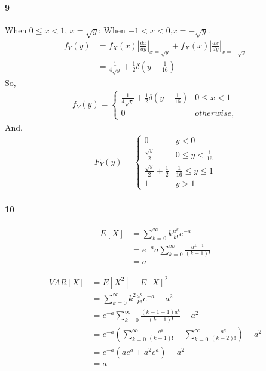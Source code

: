 \documentclass[22pt]{article}
\begin{document}
	\paragraph{9} When $0\leq x <1$, $x = \sqrt{y}$; When $-1<x<0$,$x = -\sqrt{y}$.
	\begin{align}
	f_Y(y) & = f_X(x)|\frac{dx}{dy}|_{x = \sqrt{y}} + f_X(x)|\frac{dx}{dy}|_{x = -\sqrt{y}}\\
	& = \frac{1}{4\sqrt{y}} + \frac{1}{2}\delta(y-\frac{1}{16})
	\end{align} 
	So,\begin{align}
	f_Y(y) = 
				\begin{cases}
				 \frac{1}{4\sqrt{y}} + \frac{1}{2}\delta(y-\frac{1}{16}) & 0\leq x <1\\
				 0 & otherwise,
				\end{cases}
	\end{align}
	And,\begin{align}
	F_Y(y) = 
				\begin{cases}
				 0 & y <0\\
				\frac{\sqrt{y}}{2} & 0\leq y<\frac{1}{16}\\
				\frac{\sqrt{y}}{2} + \frac{1}{2} & \frac{1}{16} \leq y \leq 1\\
				 1 & y>1
				\end{cases}
	\end{align}

	\paragraph{10}
	\begin{align}
	E[X] & = \sum_{k=0}^{\infty}k\frac{a^k}{k!}e^{-a}\\
	& = e^{-a}a\sum_{k=0}^{\infty}\frac{a^{k-1}}{(k-1)!}\\
	& = a
	\end{align}

	\begin{align}
	VAR[X] & = E[X^2] -E[X]^2\\
	& = \sum_{k=0}^{\infty}k^2\frac{a^k}{k!}e^{-a} - a^2\\
	& = e^{-a}\sum_{k=0}^{\infty}\frac{(k-1+1)a^k}{(k-1)!} - a^2\\
	& = e^{-a}(\sum_{k=0}^{\infty}\frac{a^k}{(k-1)!}+\sum_{k=0}^{\infty}\frac{a^k}{(k-2)!}) - a^2\\
	& = e^{-a}(ae^a+a^2e^a)-a^2\\
	& = a
	\end{align}
\end{document}
